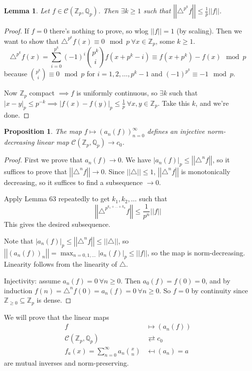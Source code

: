 \documentclass[a4paper]{article}
\newtheorem{lemma}[definition]{Lemma}
\newtheorem{prop}[definition]{Proposition}
\newcommand*\abs[1]{\left|#1\right|}
\newcommand*\norm[1]{\abs{\abs{#1}}}
\begin{document}
\begin{lemma}
	Let $f \in \mathcal{C}(\mathbb{Z}_p, \mathbb{Q}_p)$.
	Then $\exists k \geq 1$ such that $\norm{\triangle^{p^k}f} \leq \frac{1}{p}\norm{f}$.
\end{lemma}
\begin{proof}
	If $f=0$ there's nothing to prove,
	so wlog $\norm{f} = 1$ (by scaling).
	Then we want to show that $\triangle^{p^k} f(x) \equiv 0 \mod p\ \forall x \in \mathbb{Z}_p$,
	some $k \geq 1$.
	$$\triangle^{p^k} f(x) = \sum_{i=0}^{p^k}(-1)^i {p^k \choose i}f(x+p^k-i) \equiv f(x+p^k) - f(x) \mod p$$
	because ${p^k \choose i} \equiv 0 \mod p$ for $i=1,2,\dots,p^k-1$ and $(-1)^{p^k} \equiv -1 \mod p$.

	Now $\mathbb{Z}_p$ compact $\implies f$ is uniformly continuous,
	so $\exists k$ such that $\abs{x-y}_p \leq p^{-k} \implies \abs{f(x)-f(y)}_p \leq \frac{1}{p}\ \forall x,y \in \mathbb{Z}_p$.
	Take this $k$, and we're done.
\end{proof}

\begin{prop}
	The map $f \mapsto (a_n(f))_{n=0}^\infty$ defines an injective norm-decreasing linear map $\mathcal{C}(\mathbb{Z}_p,\mathbb{Q}_p) \to c_0$.
\end{prop}
\begin{proof}
	First we prove that $a_n(f) \to 0$.
	We have $\abs{a_n(f)}_p \leq \norm{\triangle^n f}$,
	so it suffices to prove that $\norm{\triangle^n f} \to 0$.
	Since $\norm{\triangle} \leq 1$,
	$\norm{\triangle^n f}$ is monotonically decreasing,
	so it suffices to find a subsequence $\to 0$.
	
	Apply Lemma 63 repeatedly to get $k_1, k_2, \dots$ such that
	$$\norm{\triangle^{p^{k_1 + \dots + k_n}}f} \leq \frac{1}{p^n}\norm{f}$$
	This gives the desired subsequence.
	
	Note that $\abs{a_n(f)}_p \leq \norm{\triangle^n f} \leq \norm{\triangle}$,
	so $\norm{(a_n(f))_n} = \max_{n=0,1,\dots}\abs{a_n(f)}_p \leq \norm{f}$,
	so the map is norm-decreasing. 
	Linearity follows from the linearity of $\triangle$.
	
	Injectivity: assume $a_n(f)=0\ \forall n \geq 0$.
	Then $a_0(f) = f(0) = 0$,
	and by induction $f(n) = \triangle^n f(0) = a_n(f) = 0\ \forall n\geq 0$.
	So $f=0$ by continuity since $\mathbb{Z}_{\geq 0} \subseteq \mathbb{Z}_p$ is dense.
\end{proof}

We will prove that the linear maps
\begin{align*}
f &\mapsto (a_n(f)) \\
\mathcal{C}(\mathbb{Z}_p, \mathbb{Q}_p) &\rightleftarrows c_0 \\
f_a(x)=\sum_{n=0}^\infty a_n {x \choose n} &\mapsfrom (a_n) = a
\end{align*}
are mutual inverses and norm-preserving.
\end{document}
